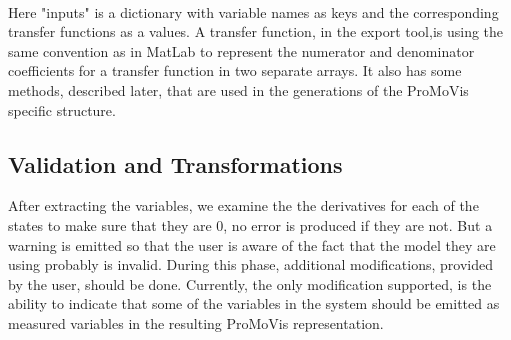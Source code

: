 \setlength\fboxsep{0pt}
\setlength\fboxrule{0.5pt}
\\\newline Here "inputs" is a dictionary with variable names as keys and the corresponding transfer functions as a values. A transfer function, in the export tool,is using the same convention as in MatLab to represent the numerator and denominator coefficients for a transfer function in two separate arrays. It also has some methods, described later, that are used in the generations of the ProMoVis specific structure. 


\subsection{Validation and Transformations}
After extracting the variables, we examine the the derivatives for each of the states to make sure that they are 0, no error is produced if they are not. But a warning is emitted so that the user is aware of the fact that the model they are using probably is invalid. During this phase, additional modifications, provided by the user, should be done. Currently, the only modification supported, is the ability to indicate that some of the variables in the system should be emitted as measured variables in the resulting ProMoVis representation. 
